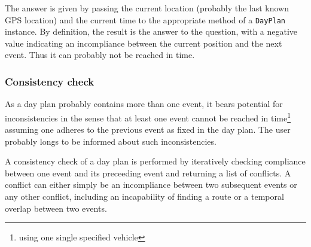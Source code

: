 The answer is given by passing the current location (probably the last known GPS location) and the current time to the appropriate method of a \texttt{DayPlan} instance. By definition, the result is the answer to the question, with a negative value indicating an incompliance between the current position and the next event. Thus it can probably not be reached in time.

\subsubsection{Consistency check}

As a day plan probably contains more than one event, it bears potential for inconsistencies in the sense that at least one event cannot be reached in time\footnote{using one single specified vehicle} assuming one adheres to the previous event as fixed in the day plan. The user probably longs to be informed about such inconsistencies.\newline

A consistency check of a day plan is performed by iteratively checking compliance between one event and its preceeding event and returning a list of conflicts. A conflict can either simply be an incompliance between two subsequent events or any other conflict, including an incapability of finding a route or a temporal overlap between two events.











